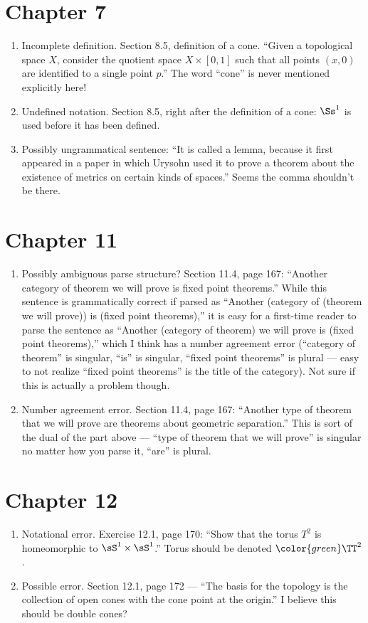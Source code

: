 \documentclass{fkletter}
\begin{document}
\section*{Chapter 7}
\begin{enumerate}
  \item Incomplete definition. Section 8.5, definition of a cone. ``Given a
    topological space $X$, consider the quotient space $X \times [0,1]$ such
    that all points $(x,0)$ are identified to a single point $p$.'' The word
    ``cone'' is never mentioned explicitly here!
  \item Undefined notation. Section 8.5, right after the definition of a cone:
    $\Ss^1$ is used before it has been defined.
  \item Possibly ungrammatical sentence: ``It is called a lemma{\color{red},}
    because it first appeared in a paper in which Urysohn used it to prove a
    theorem about the existence of metrics on certain kinds of spaces.'' Seems
    the comma shouldn't be there.
\end{enumerate}
\section*{Chapter 11}
\begin{enumerate}
  \item Possibly ambiguous parse structure? Section 11.4, page 167: ``Another
    category of theorem we will prove is fixed point theorems.'' While this
    sentence is grammatically correct if parsed as ``Another (category of
    (theorem we will prove)) is (fixed point theorems),'' {\color{red}it is easy
      for a first-time reader to parse the sentence as ``Another (category of
      theorem) we will prove is (fixed point theorems),'' which I think has a
      number agreement error (``category of theorem'' is singular, ``is'' is
      singular, ``fixed point theorems'' is plural --- easy to not realize
      ``fixed point theorems'' is the title of the category).} Not sure if this
    is actually a problem though.
  \item Number agreement error. Section 11.4, page 167: ``Another type of
    theorem that we will prove {\color{red} are} theorems about geometric
    separation.'' This is sort of the dual of the part above --- ``type of
    theorem that we will prove'' is singular no matter how you parse it, ``are''
    is plural.
\end{enumerate}
\section*{Chapter 12}
\begin{enumerate}
  \item Notational error. Exercise 12.1, page 170: ``Show that the torus
    {\color{red}$T^2$} is homeomorphic to $\sS^1 \times \sS^1$.'' Torus should
    be denoted $\color{green}\TT^2$.
  \item Possible error. Section 12.1, page 172 --- ``The basis for the topology
    is the collection of {\color{red}open cones} with the cone point at the
    origin.'' I believe this should be double cones?
\end{enumerate}
\end{document}

